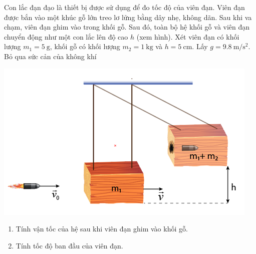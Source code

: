 \begin{ex}
	Con lắc đạn đạo là thiết bị được sử dụng để đo tốc độ của viên đạn. Viên đạn được bắn vào một khúc gỗ lớn treo lơ lửng bằng dây nhẹ, không dãn. Sau khi va chạm, viên đạn ghim vào trong khối gỗ. Sau đó, toàn bộ hệ khối gỗ và viên đạn chuyển động như một con lắc lên độ cao $h$ (xem hình). Xét viên đạn có khối lượng $m_1=\SI{5}{\gram}$, khối gỗ có khối lượng $m_2=\SI{1}{\kilogram}$ và  $h=\SI{5}{\centi\meter}$. Lấy $g=\SI{9.8}{\meter/\second^2}$. Bỏ qua sức cản của không khí
	\begin{center}
		\includegraphics[width=0.35\linewidth]{../figs/VN10-2023-PH-TP030-P-2}
	\end{center}
	\begin{enumerate}[label=\alph*)]
		\item Tính vận tốc của hệ sau khi viên đạn ghim vào khối gỗ.
		\item Tính tốc độ ban đầu của viên đạn.
	\end{enumerate}
\end{ex}
